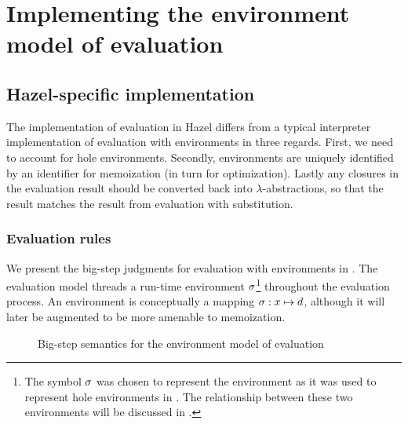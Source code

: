 \chapter{Implementing the environment model of evaluation}
\label{sec:env_model_evaluation}

\section{Hazel-specific implementation}
\label{sec:eval_with_envs}

The implementation of evaluation in Hazel differs from a typical interpreter implementation of evaluation with environments in three regards. First, we need to account for hole environments. Secondly, environments are uniquely identified by an identifier for memoization (in turn for optimization). Lastly any closures in the evaluation result should be converted back into $\lambda$-abstractions, so that the result matches the result from evaluation with substitution.

\subsection{Evaluation rules}
\label{sec:evalenv-rules}

We present the big-step judgments for evaluation with environments in . The evaluation model threads a run-time environment $\sigma$\footnote{The symbol $\sigma$ was chosen to represent the environment as it was used to represent hole environments in \cite{conf/popl/HazelnutLive19}. The relationship between these two environments will be discussed in .} throughout the evaluation process. An environment is conceptually a mapping $\sigma:x\mapsto d$, although it will later be augmented to be more amenable to memoization.

\begin{figure}
  \centering
  \begin{mdframed}
    \begin{singlespace}
      
    \end{singlespace}
  \end{mdframed}
  \caption{Big-step semantics for the environment model of evaluation}
  \label{fig:big-step-formal}
\end{figure}

